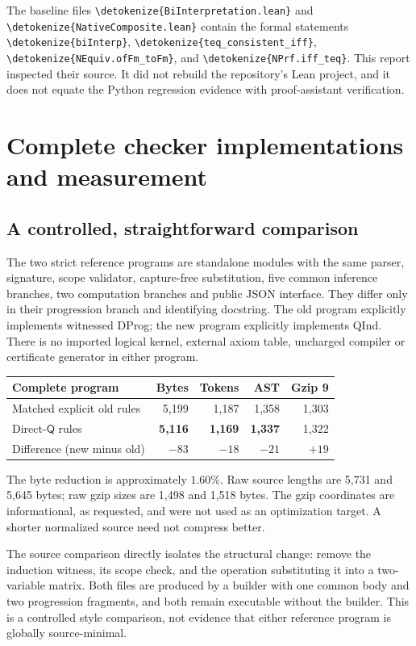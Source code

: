 \documentclass[11pt,letterpaper]{article}
\theoremstyle{definition}\newtheorem{definition}[theorem]{Definition}
\theoremstyle{remark}\newtheorem{remark}[theorem]{Remark}
\newcommand{\Q}{\mathsf Q}
\newcommand{\file}[1]{\expandafter\nolinkurl\expandafter{\detokenize{#1}}}
\begin{document}
The baseline files \file{BiInterpretation.lean} and
\file{NativeComposite.lean} contain the formal statements
\file{biInterp}, \file{teq_consistent_iff},
\file{NEquiv.ofFm_toFm}, and \file{NPrf.iff_teq}.
This report inspected their source. It did not rebuild the repository's
Lean project, and it does not equate the Python regression evidence with
proof-assistant verification.

\section{Complete checker implementations and measurement}

\subsection{A controlled, straightforward comparison}

The two strict reference programs are standalone modules with the same
parser, signature, scope validator, capture-free substitution, five common
inference branches, two computation branches and public JSON interface.
They differ only in their progression branch and identifying docstring.
The old program explicitly implements witnessed DProg; the new program
explicitly implements QInd. There is no imported logical kernel, external
axiom table, uncharged compiler or certificate generator in either program.

\begin{center}\small
\begin{tabular}{lrrrr}
\toprule
Complete program & Bytes & Tokens & AST & Gzip 9\\
\midrule
Matched explicit old rules &5,199&1,187&1,358&1,303\\
Direct-$\Q$ rules &\textbf{5,116}&\textbf{1,169}&\textbf{1,337}&1,322\\
\midrule
Difference (new minus old)&$-83$&$-18$&$-21$&$+19$\\
\bottomrule
\end{tabular}
\end{center}

The byte reduction is approximately $1.60\%$. Raw source lengths are
5,731 and 5,645 bytes; raw gzip sizes are 1,498 and 1,518 bytes. The
gzip coordinates are informational, as requested, and were not used as
an optimization target. A shorter normalized source need not compress
better.

The source comparison directly isolates the structural change: remove
the induction witness, its scope check, and the operation substituting
it into a two-variable matrix. Both files are produced by a builder with
one common body and two progression fragments, and both remain executable
without the builder. This is a controlled style comparison, not evidence
that either reference program is globally source-minimal.
\end{document}
